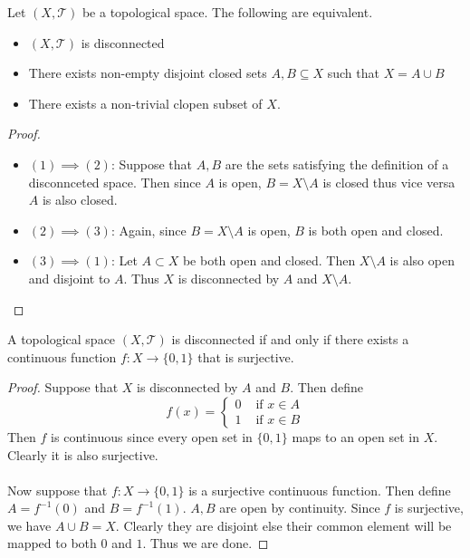 \begin{prp}{}{} Let $(X,\mathcal{T})$ be a topological space. The following are equivalent. 
\begin{itemize}
\item $(X,\mathcal{T})$ is disconnected
\item There exists non-empty disjoint closed sets $A,B\subseteq X$ such that $X=A\cup B$
\item There exists a non-trivial clopen subset of $X$. 
\end{itemize} \tcbline
\begin{proof}~\\
\begin{itemize}
\item $(1)\implies(2)$: Suppose that $A,B$ are the sets satisfying the definition of a disconnceted space. Then since $A$ is open, $B=X\setminus A$ is closed thus vice versa $A$ is also closed. 
\item $(2)\implies(3)$: Again, since $B=X\setminus A$ is open, $B$ is both open and closed. 
\item $(3)\implies(1)$: Let $A\subset X$ be both open and closed. Then $X\setminus A$ is also open and disjoint to $A$. Thus $X$ is disconnected by $A$ and $X\setminus A$. 
\end{itemize}
\end{proof}
\end{prp}

\begin{prp}{}{} A topological space $(X,\mathcal{T})$ is disconnected if and only if there exists a continuous function $f:X\to\{0,1\}$ that is surjective. \tcbline
\begin{proof}
Suppose that $X$ is disconnected by $A$ and $B$. Then define $$f(x)=\begin{cases}
0 &\text{ if }x\in A\\
1 & \text{ if }x\in B
\end{cases}$$
Then $f$ is continuous since every open set in $\{0,1\}$ maps to an open set in $X$. Clearly it is also surjective. \\~\\
Now suppose that $f:X\to\{0,1\}$ is a surjective continuous function. Then define $A=f^{-1}(0)$ and $B=f^{-1}(1)$. $A,B$ are open by continuity. Since $f$ is surjective, we have $A\cup B=X$. Clearly they are disjoint else their common element will be mapped to both $0$ and $1$. Thus we are done. 
\end{proof}
\end{prp}

